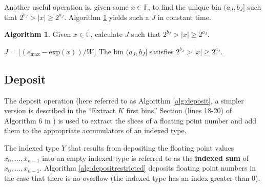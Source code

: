 \documentclass[12pt]{article}
\providecommand{\F}{\ensuremath{\mathbb{F}}}
\providecommand{\exp}{\ensuremath{\text{exp}}}
\providecommand{\max}{\ensuremath{\text{max}}}
\theoremstyle{definition}
\newtheorem{alg}{Algorithm}[section]
\numberwithin{equation}{section}
\numberwithin{figure}{section}
\begin{document}
    Another useful operation is, given some $x \in \F$, to find the unique bin $(a_J, b_J]$ such that $2^{b_J} > |x| \geq 2^{a_J}$. Algorithm \ref{alg:index} yields such a $J$ in constant time.

    \begin{samepage}
    \begin{alg}
      Given $x \in \F$, calculate $J$ such that $2^{b_J} > |x| \geq 2^{a_J}$.
      \begin{algorithmic}[1]
          \State $J = \lfloor(e_{\max} - \exp(x))/W\rfloor$
        \EndFunction
        \Ensure
          \Statex The bin $(a_{J}, b_{J}]$ satisfies $2^{b_{J}} > |x| \geq 2^{a_{J}}$.
      \end{algorithmic}
      \label{alg:index}
    \end{alg}
     \end{samepage}

  \subsection{Deposit}
    \label{sec:primitiveops_deposit}
    The deposit operation (here referred to as Algorithm \ref{alg:deposit}, a simpler version is described in the ``Extract $K$ first bins'' Section (lines 18-20) of Algorithm $6$ in \cite{repsum}) is used to extract the slices of a floating point number and add them to the appropriate accumulators of an indexed type.

    The indexed type $Y$ that results from depositing the floating point values $x_0, ..., x_{n - 1}$ into an empty indexed type is referred to as the \textbf{indexed sum} of $x_0, ..., x_{n - 1}$. Algorithm \ref{alg:depositrestricted} deposits floating point numbers in the case that there is no overflow (the indexed type has an index greater than 0).
\end{document}
